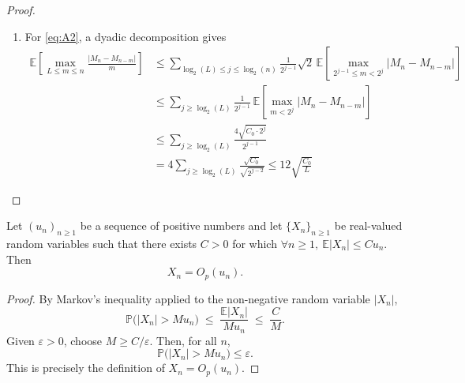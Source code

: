 \begin{proof}
\begin{enumerate}[label=(\roman*)]
		\item For \eqref{eq:A2}, a dyadic decomposition gives
		\begin{align*}
			\mathbb{E} \left[ \max_{L \leq m \leq n} \frac{|M_n - M_{n - m}|}{m} \right]
			&\leq \sum_{\log_2(L) \leq j \leq \log_2(n)} 
			\frac{1}{2^{j - 1}} \sqrt{2} \, \mathbb{E} \left[ 
			\max_{2^{j - 1} \leq m < 2^j} |M_n - M_{n - m}| \right] \\
			&\leq \sum_{j \geq \log_2(L)} 
			\frac{1}{2^{j - 1}} \, \mathbb{E} \left[ 
			\max_{m < 2^j} |M_n - M_{n - m}| \right] \\
			&\leq \sum_{j \geq \log_2(L)} 
			\frac{4\sqrt{C_0 \cdot 2^j}}{2^{j - 1}} \\
			&= 4\sum_{j \geq \log_2(L)} \frac{\sqrt{C_0}}{\sqrt{2^{j - 2}}}
			\leq 12 \sqrt{\frac{C_0}{L}}	
		\end{align*}
	\end{enumerate}
	
\end{proof}


\begin{lemma}\label{lem:expectation-to-O}
	Let $(u_n)_{n\ge1}$ be a sequence of positive numbers and let $\{X_n\}_{n\ge1}$ be real-valued random variables such that there exists $C>0$ for which \(\forall n \geq 1, \ \mathbb{E}|X_n|\le C u_n\). 
	Then 
	\[X_n = O_p(u_n).\]
\end{lemma}

\begin{proof}
	By Markov's inequality applied to the non-negative random variable $|X_n|$,
	\[
	\mathbb{P}\big(|X_n|> M u_n\big)
	\;\le\; \frac{\mathbb{E}|X_n|}{M u_n}
	\;\le\; \frac{C}{M}.
	\]
	Given $\varepsilon>0$, choose $M\ge C/\varepsilon$. Then, for all $n$,
	\[
	\mathbb{P}\big(|X_n|> M u_n\big)\le \varepsilon.
	\]
	This is precisely the definition of $X_n=O_p(u_n)$.
\end{proof}

	
